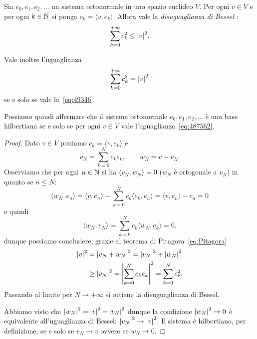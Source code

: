 \begin{theorem}
\label{th:bessel}%
Sia $e_0, e_1, e_2, \dots$ un sistema ortonormale in uno spazio euclideo $V$.
Per ogni $v\in V$ e per ogni $k\in {\mathbb N}$ si ponga $c_k = \langle v,e_k\rangle$.
Allora vale la
\emph{disuguaglianza di Bessel}%
:
\begin{equation}\label{eq:disuguaglianza_Bessel}
\sum_{k=0}^{+\infty} c_k^2 \le {\left|v\right|}^2.
\end{equation}

Vale inoltre l'uguaglianza
\begin{equation}\label{eq:487562}
\sum_{k=0}^{+\infty} c_k^2 = {\left|v\right|}^2
\end{equation}
se e solo se vale la~\eqref{eq:49346}.

Possiamo quindi affermare che il sistema ortonormale $e_0, e_1, e_2, \dots$
è una base hilbertiana se e solo se per ogni $v\in V$ vale l'uguaglianza~\eqref{eq:487562}.
\end{theorem}
%
\begin{proof}
Dato $v\in V$ poniamo $c_k = \langle v,e_k\rangle$ e
\[
   v_N = \sum_{k=0}^N c_k e_k, \qquad w_N = v - v_N.
\]
Osserviamo che per ogni $n\in {\mathbb N}$ si ha $\langle v_N,w_N\rangle=0$
($w_N$ è ortogonale a $v_N$)
in quanto se $n\le N$:
\[
  \langle w_N , e_n \rangle
  = \langle v, e_n\rangle - \sum_{k=0}^N c_k \langle e_k, e_n\rangle
  = \langle v,e_n\rangle - c_n = 0
\]
e quindi
\[
 \langle w_N, v_N \rangle = \sum_{k=0}^N c_k \langle w_N, e_k\rangle = 0.
\]
dunque possiamo concludere, grazie al teorema di Pitagora~\eqref{eq:Pitagora}
\begin{align*}
  {\left|v\right|}^2
  &= {\left|v_N + w_N\right|}^2
  = {\left|v_N\right|}^2 + {\left|w_N\right|}^2 \\
  &\ge {\left|v_N\right|}^2 = {\left|\sum_{k=0}^N c_k e_k\right|}^2
  = \sum_{k=0}^N c_k^2.
\end{align*}
Passando al limite per $N\to +\infty$ si ottiene la disuguaglianza
di Bessel.

Abbiamo visto che ${\left|w_N\right|}^2 = {\left|v\right|}^2 - {\left|v_N\right|}^2$
dunque la condizione ${\left|w_N\right|}^2\to 0$ è equivalente
all'uguaglianza di Bessel: ${\left|v_N\right|}^2 \to {\left|v\right|}^2$.
Il sistema è hilbertiano, per definizione, se e solo se $v_N \to v$
ovvero se $w_N\to 0$.
\end{proof}

